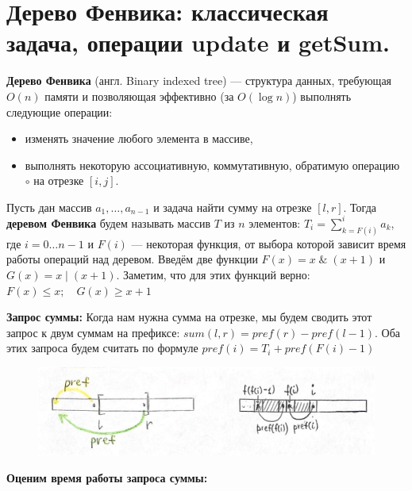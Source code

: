 \setcounter{section}{69}
\section{Дерево Фенвика: классическая задача, операции update и getSum. }
\textbf{Дерево Фенвика} (англ. Binary indexed tree) — структура данных, требующая $O(n)$ памяти и позволяющая эффективно (за $O(\log n)$) выполнять следующие операции:
\begin{itemize}
    \item изменять значение любого элемента в массиве,
    \item выполнять некоторую ассоциативную, коммутативную, обратимую операцию $\circ$ на отрезке $[i,j]$.
\end{itemize}
\par \noindent Пусть дан массив $a_1, \ldots, a_{n-1}$ и задача найти сумму на отрезке $[l,r]$.
\newline Тогда \textbf{деревом Фенвика} будем называть массив $T$ из $n$ элементов: $T_i=\sum_{k=F(i)}^{i}a_k$, где $i=0\ldots n-1$ и $F(i)$ — некоторая функция, от выбора которой зависит время работы операций над деревом.
Введём две функции $F(x)=x \; \& \; (x+1)$ и $G(x)=x \; | \; (x+1)$. \newline Заметим, что для этих функций верно: $F(x)\leq x; \quad G(x) \geq x+1$
\\ \par \textbf{Запрос суммы:} Когда нам нужна сумма на отрезке, мы будем сводить этот запрос к двум суммам на префиксе: $sum(l,r)=pref(r)-pref(l-1)$. Оба этих запроса будем считать по формуле $pref(i) = T_i+pref(F(i)-1)$
\begin{figure}[h]
\centering
\includegraphics[width=1\linewidth]{images/70-75_fenwick}
\end{figure}
\par \textbf{Оценим время работы запроса суммы:}
